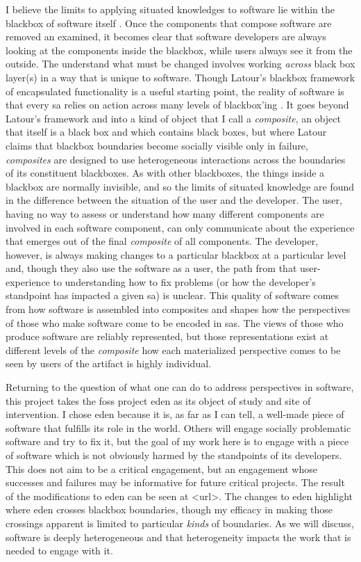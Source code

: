 \documentclass[a4paper,man,natbib]{apa6}
\begin{document}
   I believe the limits to applying situated knowledges to software lie within the blackbox of software itself \citep{Latour1999-ui}. Once the components that compose software are removed an examined, it becomes clear that software developers are always looking at the components inside the blackbox, while users always see it from the outside. The understand what must be changed involves working \textit{across} black box layer(s) in a way that is unique to software. Though Latour's blackbox framework of encapsulated functionality is a useful starting point, the reality of software is that every \gls{sa} relies on action across many levels of blackbox'ing \citep{Latour1999-ui}. It goes beyond Latour's framework and into a kind of object that I call a \textit{composite}, an object that itself is a black box and which contains black boxes, but where Latour claims that blackbox boundaries become socially visible only in failure, \textit{composites} are designed to use heterogeneous interactions across the boundaries of its constituent blackboxes. As with other blackboxes, the things inside a blackbox are normally invisible, and so the limits of situated knowledge are found in the difference between the situation of the user and the developer. The user, having no way to assess or understand how many different components are involved in each software component, can only communicate about the experience that emerges out of the final \textit{composite} of all components. The developer, however, is always making changes to a particular blackbox at a particular level and, though they also use the software as a user, the path from that user-experience to understanding how to fix problems (or how the developer's standpoint has impacted a given \gls{sa}) is unclear. This quality of software comes from how software is assembled into composites and shapes how the perspectives of those who make software come to be encoded in \glspl{sa}. The views of those who produce software are reliably represented, but those representations exist at different levels of the \textit{composite} how each materialized perspective comes to be seen by users of the artifact is highly individual.

   Returning to the question of what one can do to address perspectives in software, this project takes the \acrfull{foss} project \acrfull{eden} as its object of study and site of intervention. I chose \acrshort{eden} because it is, as far as I can tell, a well-made piece of software that fulfills its role in the world. Others will engage socially problematic software and try to fix it, but the goal of my work here is to engage with a piece of software which is not obviously harmed by the standpoints of its developers. This does not aim to be a critical engagement, but an engagement whose successes and failures may be informative for future critical projects. The result of the modifications to \acrshort{eden} can be seen at <url>. The changes to \acrshort{eden} highlight where \acrshort{eden} crosses blackbox boundaries, though my efficacy in making those crossings apparent is limited to particular \textit{kinds} of boundaries. As we will discuss, software is deeply heterogeneous and that heterogeneity impacts the work that is needed to engage with it. 
\end{document}
